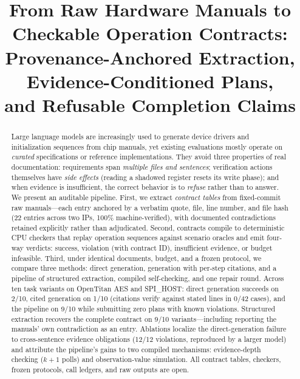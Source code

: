 \documentclass[conference]{IEEEtran}
\begin{document}
\title{From Raw Hardware Manuals to Checkable Operation Contracts:\\
Provenance-Anchored Extraction, Evidence-Conditioned Plans,\\
and Refusable Completion Claims}

\author{
}

\maketitle

\begin{abstract}
Large language models are increasingly used to generate device drivers and
initialization sequences from chip manuals, yet existing evaluations mostly
operate on \emph{curated} specifications or reference implementations. They
avoid three properties of real documentation: requirements span
\emph{multiple files and sentences}; verification actions themselves have
\emph{side effects} (reading a shadowed register resets its write phase);
and when evidence is insufficient, the correct behavior is to \emph{refuse}
rather than to answer. We present an auditable pipeline. First, we extract
\emph{contract tables} from fixed-commit raw manuals---each entry anchored
by a verbatim quote, file, line number, and file hash (22 entries across
two IPs, 100\% machine-verified), with documented contradictions retained
explicitly rather than adjudicated. Second, contracts compile to
deterministic CPU checkers that replay operation sequences against
scenario oracles and emit four-way verdicts: success, violation (with
contract ID), insufficient evidence, or budget infeasible. Third, under
identical documents, budget, and a frozen protocol, we compare three
methods: direct generation, generation with per-step citations, and a
pipeline of structured extraction, compiled self-checking, and one
repair round. Across ten task variants on OpenTitan AES and SPI\_HOST:
direct generation succeeds on 2/10, cited generation on 1/10 (citations
verify against stated lines in 0/42 cases), and the pipeline on 9/10
while submitting zero plans with known violations. Structured extraction
recovers the complete contract on 9/10 variants---including reporting
the manuals' own contradiction as an entry. Ablations localize the
direct-generation failure to cross-sentence evidence obligations
(12/12 violations, reproduced by a larger model) and attribute the
pipeline's gains to two compiled mechanisms: evidence-depth checking
($k{+}1$ polls) and observation-value simulation. All contract tables,
checkers, frozen protocols, call ledgers, and raw outputs are open.
\end{abstract}
\end{document}
